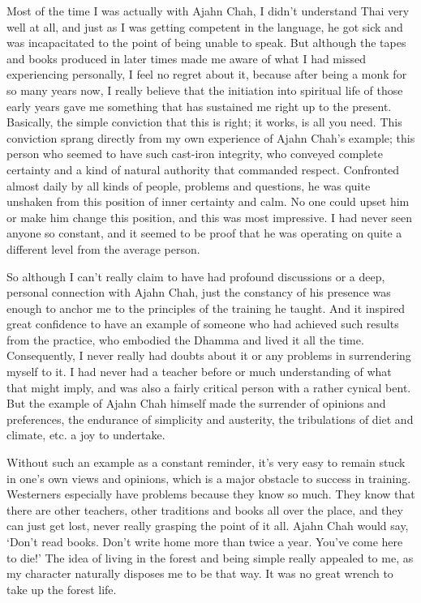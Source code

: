 Most of the time I was actually with Ajahn Chah, I didn't understand
Thai very well at all, and just as I was getting competent in the
language, he got sick and was incapacitated to the point of being unable
to speak. But although the tapes and books produced in later times made
me aware of what I had missed experiencing personally, I feel no regret
about it, because after being a monk for so many years now, I really
believe that the initiation into spiritual life of those early years
gave me something that has sustained me right up to the present. 
Basically, the simple conviction that this is right; it works, is all
you need. This conviction sprang directly from my own experience of
Ajahn Chah's example; this person who seemed to have such cast-iron
integrity, who conveyed complete certainty and a kind of natural
authority that commanded respect. Confronted almost daily by all kinds
of people, problems and questions, he was quite unshaken from this
position of inner certainty and calm. No one could upset him or make him
change this position, and this was most impressive. I had never seen
anyone so constant, and it seemed to be proof that he was operating on
quite a different level from the average person. 

So although I can't really claim to have had profound discussions or a
deep, personal connection with Ajahn Chah, just the constancy of his
presence was enough to anchor me to the principles of the training he
taught. And it inspired great confidence to have an example of someone
who had achieved such results from the practice, who embodied the Dhamma
and lived it all the time. Consequently, I never really had doubts about
it or any problems in surrendering myself to it. I had never had a
teacher before or much understanding of what that might imply, and was
also a fairly critical person with a rather cynical bent. But the
example of Ajahn Chah himself made the surrender of opinions and
preferences, the endurance of simplicity and austerity, the tribulations
of diet and climate, etc. a joy to undertake. 

Without such an example as a constant reminder, it's very easy to remain
stuck in one's own views and opinions, which is a major obstacle to
success in training. Westerners especially have problems because they
know so much. They know that there are other teachers, other traditions
and books all over the place, and they can just get lost, never really
grasping the point of it all. Ajahn Chah would say, `Don't read books. 
Don't write home more than twice a year. You've come here to die!' The
idea of living in the forest and being simple really appealed to me, as
my character naturally disposes me to be that way. It was no great
wrench to take up the forest life. 

